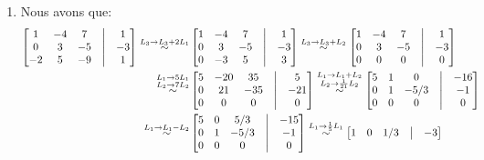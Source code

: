 \begin{exercice}
\begin{enumerate}
    \item  Nous avons que:
    \begin{align*}
        \begin{bmatrix}
        1 & -4 & 7 & \bigm| & 1 \\
        0 & 3 & -5 & \bigm| & -3 \\
        -2 & 5 & -9 & \bigm| & 1
        \end{bmatrix}
        \overset{L_3 \rightarrow L_3+2L_1}{\sim}
        &\begin{bmatrix}
        1 & -4 & 7 & \bigm| & 1 \\
        0 & 3 & -5 & \bigm| & -3 \\
        0 & -3 & 5 & \bigm| & 3
        \end{bmatrix}
        \overset{L_3 \rightarrow L_3+L_2}{\sim}
        \begin{bmatrix}
        1 & -4 & 7 & \bigm| & 1 \\
        0 & 3 & -5 & \bigm| & -3 \\
        0 & 0 & 0 & \bigm| & 0
        \end{bmatrix} \\
        \overset{\substack{L_1 \rightarrow 5L_1 \\ L_2 \rightarrow 7L_2}}{\sim}
        &\begin{bmatrix}
        5 & -20 & 35 & \bigm| & 5 \\
        0 & 21 & -35 & \bigm| & -21 \\
        0 & 0 & 0 & \bigm| & 0
        \end{bmatrix}
        \overset{\substack{L_1 \rightarrow L_1+L_2 \\ L_2 \rightarrow \frac{1}{21}L_2}}{\sim}
        \begin{bmatrix}
        5 & 1 & 0 & \bigm| & -16 \\
        0 & 1 & -5/3 & \bigm| & -1 \\
        0 & 0 & 0 & \bigm| & 0
        \end{bmatrix} \\
        \overset{L_1 \rightarrow L_1-L_2}{\sim}
        &\begin{bmatrix}
        5 & 0 & 5/3 & \bigm| & -15 \\
        0 & 1 & -5/3 & \bigm| & -1 \\
        0 & 0 & 0 & \bigm| & 0
        \end{bmatrix}
        \overset{L_1 \rightarrow \frac{1}{5}L_1}{\sim}
        \begin{bmatrix}
        1 & 0 & 1/3 & \bigm| & -3 \\

\end{bmatrix}
\end{align*}
\end{enumerate}
\end{exercice}
